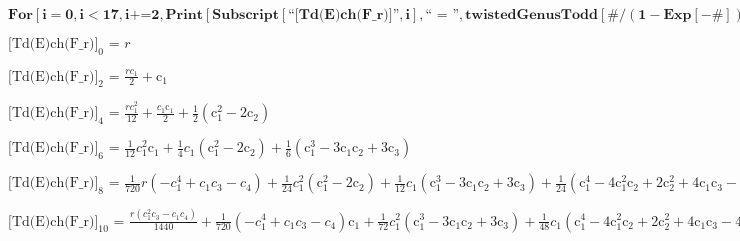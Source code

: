 \documentclass{article}
\newcommand{\unicode}[1]{{}}
\begin{document}
\begin{doublespace}
\noindent\(\pmb{\text{For}\left[i=0,i<17,i\text{+=}2, \text{Print}\left[\text{Subscript}[\text{{``}[Td(E)ch(F$\_$r)]{''}},i],\text{{``} = {''}},\text{twistedGenusTodd}[\#/(1-\text{Exp}[-\#])\&,i]
\text{/.}c_2\to 0\right]\right]}\)
\end{doublespace}

\noindent\(\text{[Td(E)ch(F$\_$r)]}_0\text{ = }r\)

\noindent\(\text{[Td(E)ch(F$\_$r)]}_2\text{ = }\frac{r c_1}{2}+\text{c$\unicode{02bc}$}_1\)

\noindent\(\text{[Td(E)ch(F$\_$r)]}_4\text{ = }\frac{r c_1^2}{12}+\frac{c_1 \text{c$\unicode{02bc}$}_1}{2}+\frac{1}{2} \left(\text{c$\unicode{02bc}$}_1^2-2
\text{c$\unicode{02bc}$}_2\right)\)

\noindent\(\text{[Td(E)ch(F$\_$r)]}_6\text{ = }\frac{1}{12} c_1^2 \text{c$\unicode{02bc}$}_1+\frac{1}{4} c_1 \left(\text{c$\unicode{02bc}$}_1^2-2
\text{c$\unicode{02bc}$}_2\right)+\frac{1}{6} \left(\text{c$\unicode{02bc}$}_1^3-3 \text{c$\unicode{02bc}$}_1 \text{c$\unicode{02bc}$}_2+3 \text{c$\unicode{02bc}$}_3\right)\)

\noindent\(\text{[Td(E)ch(F$\_$r)]}_8\text{ = }\frac{1}{720} r \left(-c_1^4+c_1 c_3-c_4\right)+\frac{1}{24} c_1^2 \left(\text{c$\unicode{02bc}$}_1^2-2
\text{c$\unicode{02bc}$}_2\right)+\frac{1}{12} c_1 \left(\text{c$\unicode{02bc}$}_1^3-3 \text{c$\unicode{02bc}$}_1 \text{c$\unicode{02bc}$}_2+3 \text{c$\unicode{02bc}$}_3\right)+\frac{1}{24}
\left(\text{c$\unicode{02bc}$}_1^4-4 \text{c$\unicode{02bc}$}_1^2 \text{c$\unicode{02bc}$}_2+2 \text{c$\unicode{02bc}$}_2^2+4 \text{c$\unicode{02bc}$}_1
\text{c$\unicode{02bc}$}_3-4 \text{c$\unicode{02bc}$}_4\right)\)

\noindent\(\text{[Td(E)ch(F$\_$r)]}_{10}\text{ = }\frac{r \left(c_1^2 c_3-c_1 c_4\right)}{1440}+\frac{1}{720} \left(-c_1^4+c_1 c_3-c_4\right) \text{c$\unicode{02bc}$}_1+\frac{1}{72}
c_1^2 \left(\text{c$\unicode{02bc}$}_1^3-3 \text{c$\unicode{02bc}$}_1 \text{c$\unicode{02bc}$}_2+3 \text{c$\unicode{02bc}$}_3\right)+\frac{1}{48}
c_1 \left(\text{c$\unicode{02bc}$}_1^4-4 \text{c$\unicode{02bc}$}_1^2 \text{c$\unicode{02bc}$}_2+2 \text{c$\unicode{02bc}$}_2^2+4 \text{c$\unicode{02bc}$}_1
\text{c$\unicode{02bc}$}_3-4 \text{c$\unicode{02bc}$}_4\right)+\frac{1}{120} \left(\text{c$\unicode{02bc}$}_1^5-5 \text{c$\unicode{02bc}$}_1^3 \text{c$\unicode{02bc}$}_2+5
\text{c$\unicode{02bc}$}_1 \text{c$\unicode{02bc}$}_2^2+5 \text{c$\unicode{02bc}$}_1^2 \text{c$\unicode{02bc}$}_3-5 \text{c$\unicode{02bc}$}_2 \text{c$\unicode{02bc}$}_3-5
\text{c$\unicode{02bc}$}_1 \text{c$\unicode{02bc}$}_4+5 \text{c$\unicode{02bc}$}_5\right)\)
\end{document}
